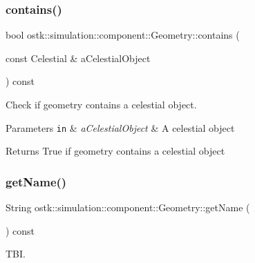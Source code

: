 \subsubsection{\texorpdfstring{contains()}{contains()}\hspace{0.1cm}{\footnotesize\ttfamily [2/2]}}
{\footnotesize\ttfamily bool ostk\+::simulation\+::component\+::\+Geometry\+::contains (\begin{DoxyParamCaption}\item[{const Celestial \&}]{a\+Celestial\+Object }\end{DoxyParamCaption}) const}



Check if geometry contains a celestial object. 


\begin{DoxyParams}[1]{Parameters}
\mbox{\tt in}  & {\em a\+Celestial\+Object} & A celestial object \\
\hline
\end{DoxyParams}
\begin{DoxyReturn}{Returns}
True if geometry contains a celestial object 
\end{DoxyReturn}
\mbox{\label{classostk_1_1simulation_1_1component_1_1_geometry_a2f13ab1988d7d64407f63100fd547fd0}} 
\subsubsection{\texorpdfstring{get\+Name()}{getName()}}
{\footnotesize\ttfamily String ostk\+::simulation\+::component\+::\+Geometry\+::get\+Name (\begin{DoxyParamCaption}{ }\end{DoxyParamCaption}) const}



T\+BI. 

\mbox{\label{classostk_1_1simulation_1_1component_1_1_geometry_a3fe1b4be3ee05faab0ff647697afcd6e}} 
